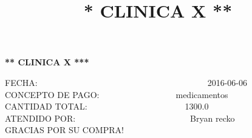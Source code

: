 \documentclass[10pt,a4paper]{letter}
\title{\bf ** CLINICA X **}
\begin{document}
\begin{center}
{\scshape\LARGE \bf *** CLINICA X ***\par}

\end{center}

FECHA:\ \ \ \ \ \ \ \ \ \ \ \ \ \ \ \ \ \ \ \ \ \ \ \ \ \ \ \ \ \ \ \ \ \ \ \ \ \ \ \ 2016-06-06 \\
CONCEPTO DE PAGO:\ \ \ \ \ \ \ \ \ \ \ \ \ \ \ \ \ \ medicamentos \\
CANTIDAD TOTAL:\ \ \ \ \ \ \ \ \ \ \ \ \ \ \ \ \ \ \ \ \ \ \ 1300.0 \\
ATENDIDO POR:\ \ \ \ \ \ \ \ \ \ \ \ \ \ \ \ \ \ \ \ \ \ \ \ \ \ \ Bryan recko \\
GRACIAS POR SU COMPRA! \\ \\

 
\end{document}
